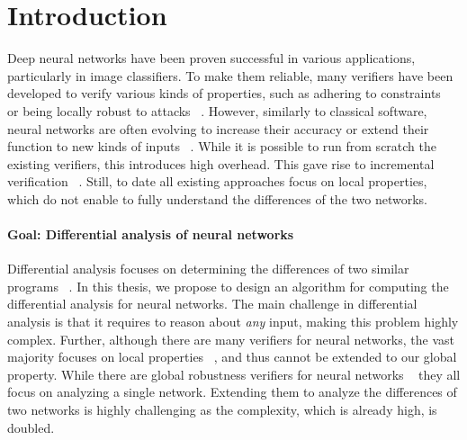 
\section{Introduction}
Deep neural networks have been proven successful in various applications,  particularly in image classifiers.
To make them reliable, many verifiers have been developed to verify various kinds of properties, such as adhering to constraints~\cite{Reluplex,COMPLETE,PLANET} or being locally robust to attacks ~\cite{Reluplex,ABSTRACTINTER,NEURIPS2021_fac7fead,COMPLETE}. However, similarly to classical software, neural networks are often evolving to increase their accuracy or extend their function to new kinds of inputs ~\cite{SURVEY_ROBUSTNESS,INTPROP}. While it is possible to run from scratch the existing verifiers, this introduces high overhead. This gave rise to incremental verification ~\cite{IVAN,INC_SEMIDEFINIT,INC_SMOOTH}. Still, to date all existing approaches focus on local properties, which do not enable to fully understand the differences of the two networks.

\paragraph{Goal: Differential analysis of neural networks}
Differential analysis focuses on determining the differences of two similar programs ~\cite{RELUDIFF,NEURODIFF,DIFFRNN,QEBVERIF,CFXROBUSTNESS}.
In this thesis, we propose to design an algorithm for computing the differential analysis for neural networks.
The main challenge in differential analysis is that it requires to reason about \emph{any} input, 
making this problem highly complex. Further, although there are many verifiers for neural networks, the vast majority focuses on local properties ~\cite{Reluplex,ABSTRACTINTER,NEURIPS2021_fac7fead,COMPLETE,CROWN}, and thus cannot be extended to our global property. While there are global robustness verifiers for neural networks ~\cite{Reluplex,ANOTHERGLOBALPROPERTY,MEASURENNROBCON,GLOBALPROPERTY} they all focus on analyzing a single network. Extending them to analyze the differences of two networks is highly challenging as the complexity, which is already high, is doubled.


